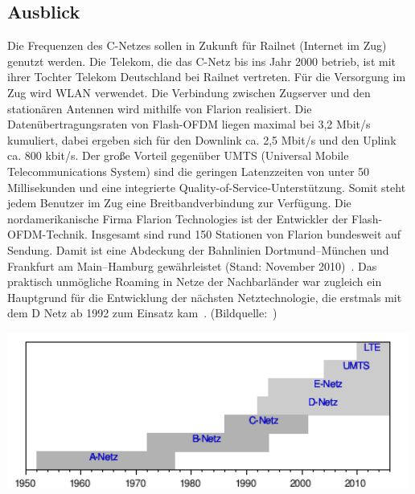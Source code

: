 \begin{multicols}{3}
\subsection*{Ausblick}
Die Frequenzen des C-Netzes sollen in Zukunft für Railnet (Internet im Zug) genutzt werden. Die Telekom, die das C-Netz bis ins Jahr 2000 betrieb, ist mit ihrer Tochter Telekom Deutschland bei Railnet vertreten. Für die Versorgung im Zug wird WLAN verwendet. Die Verbindung zwischen Zugserver und den stationären Antennen wird mithilfe von Flarion realisiert. Die Datenübertragungsraten von Flash-OFDM liegen maximal bei 3,2 Mbit/s kumuliert, dabei ergeben sich für den Downlink ca. 2,5 Mbit/s und den Uplink ca. 800 kbit/s. Der große Vorteil gegenüber UMTS (Universal Mobile Telecommunications System) sind die geringen Latenzzeiten von unter 50 Millisekunden und eine integrierte Quality-of-Service-Unterstützung. Somit steht jedem Benutzer im Zug eine Breitbandverbindung zur Verfügung. 
Die nordamerikanische Firma Flarion Technologies ist der Entwickler der Flash-OFDM-Technik. Insgesamt sind rund 150 Stationen von Flarion bundesweit auf Sendung. Damit ist eine Abdeckung der Bahnlinien Dortmund–München und Frankfurt am Main–Hamburg gewährleistet (Stand: November 2010)~\cite{c-netz.3}.
Das praktisch unmögliche Roaming in Netze der Nachbarländer war zugleich ein Hauptgrund für die Entwicklung der nächsten Netztechnologie, die erstmals mit dem D Netz ab 1992 zum Einsatz kam~\cite{c-netz.1}. (Bildquelle:~\cite{c-netz.9}) 
\printbibliography[segment=6,heading=subbibliography]
\end{multicols}
\begin{Figure}
\centering
\includegraphics[height=51mm]{Kapitel/C-Netz/Grafiken/ZeitstrahlWiki.png}
\end{Figure}
\newpage
